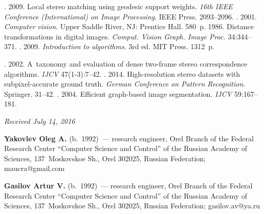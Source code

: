  \begin{multicols}{2}

\renewcommand{\bibname}{\protect\rmfamily References}

{\small\frenchspacing
 {%
 \begin{thebibliography}{9}
. 2009. Local stereo 
matching using geodesic support weights. \textit{16th IEEE Conference 
(International) on Image Processing}. IEEE Press. 2093--2096.
. 2001. \textit{Computer vision}.  
Upper Saddle River, NJ: Prentice Hall. 580~p.
 1986. Distance transformations in digital images.  
\textit{Comput. Vision Graph. Image Proc.} 34:344--371.
. 2009. 
\textit{Introduction to algorithms}. 3rd ed. MIT Press. 1312~p.


. 2002. A~taxonomy and evaluation of 
dense two-frame stereo correspondence algorithms. \textit{IJCV}  
47(1-3):7--42.
. 2014. High-resolution 
stereo datasets with subpixel-accurate ground truth. \textit{German Conference 
on Pattern Recognition}. Springer. 31--42.
. 2004. Efficient 
graph-based image segmentation. \textit{IJCV} 59:167--181.
   \end{thebibliography}

 }
 }

\end{multicols}

\vspace*{-3pt}

\hfill{\small\textit{Received July 14, 2016}}

\vspace*{-3pt}

\Contr

\noindent
\textbf{Yakovlev Oleg A.} (b.\ 1992)~--- research engineer, Orel Branch of the 
Federal Research Center ``Computer Science and Control'' of the Russian Academy 
of Sciences, 137~Moskovskoe Sh., Orel 302025, Russian Federation; 
\mbox{maucra@gmail.com}


\vspace*{5pt}

\noindent
\textbf{Gasilov Artur V.} (b.\ 1992)~--- research engineer, Orel Branch of the Federal 
Research Center ``Computer Science and Control'' of the Russian Academy of 
Sciences, 137~Moskovskoe Sh., Orel 302025, Russian Federation; 
\mbox{gasilov.av@ya.ru}

  \label{end\stat}
  
  
  \renewcommand{\bibname}{\protect\rm Литература}
